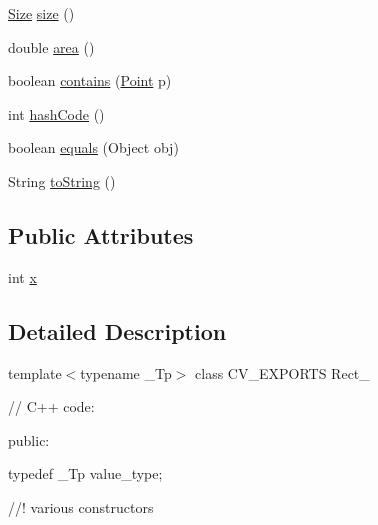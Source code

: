\begin{DoxyCompactItemize}
\mbox{\hyperlink{classorg_1_1opencv_1_1core_1_1_size}{Size}} \mbox{\hyperlink{classorg_1_1opencv_1_1core_1_1_rect_ab35af68258ae2213ccce57addd38d63f}{size}} ()
\item 
double \mbox{\hyperlink{classorg_1_1opencv_1_1core_1_1_rect_a71bc684fb65bb6242f0dc747f0baf670}{area}} ()
\item 
boolean \mbox{\hyperlink{classorg_1_1opencv_1_1core_1_1_rect_ac504e31969dbf5522410201cab796ba4}{contains}} (\mbox{\hyperlink{classorg_1_1opencv_1_1core_1_1_point}{Point}} p)
\item 
int \mbox{\hyperlink{classorg_1_1opencv_1_1core_1_1_rect_aa3f023d01a79947ba8ca84c8f7fb5179}{hash\+Code}} ()
\item 
boolean \mbox{\hyperlink{classorg_1_1opencv_1_1core_1_1_rect_a2db251d89a9308ac656a3d86a75ab199}{equals}} (Object obj)
\item 
String \mbox{\hyperlink{classorg_1_1opencv_1_1core_1_1_rect_a57d61542ecbc32a270f93b4b120699fe}{to\+String}} ()
\end{DoxyCompactItemize}
\subsection*{Public Attributes}
\begin{DoxyCompactItemize}
\item 
int \mbox{\hyperlink{classorg_1_1opencv_1_1core_1_1_rect_a44cd51a7947e8371834a5e0c53b1c1fc}{x}}
\end{DoxyCompactItemize}


\subsection{Detailed Description}
template$<$typename \+\_\+\+Tp$>$ class C\+V\+\_\+\+E\+X\+P\+O\+R\+TS Rect\+\_\+ {\ttfamily }

{\ttfamily }

{\ttfamily }

{\ttfamily // C++ code\+:}

{\ttfamily }

{\ttfamily }

{\ttfamily public\+:}

{\ttfamily }

{\ttfamily }

{\ttfamily typedef \+\_\+\+Tp value\+\_\+type;}

{\ttfamily }

{\ttfamily }

{\ttfamily //! various constructors}

